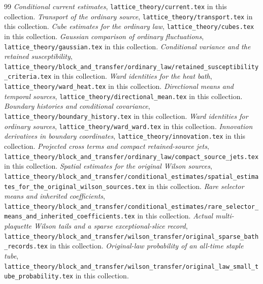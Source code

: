 \documentclass[11pt]{article}
\theoremstyle{definition}
\begin{document}
\begin{thebibliography}{99}
 \emph{Conditional current estimates}, \texttt{lattice\_theory/current.tex} in this collection.
 \emph{Transport of the ordinary source}, \texttt{lattice\_theory/transport.tex} in this collection.
 \emph{Cube estimates for the ordinary law}, \texttt{lattice\_theory/cubes.tex} in this collection.
 \emph{Gaussian comparison of ordinary fluctuations}, \texttt{lattice\_theory/gaussian.tex} in this collection.
 \emph{Conditional variance and the retained susceptibility},
\texttt{lattice\_theory/block\_and\_transfer/ordinary\_law/retained\_susceptibility\_criteria.tex} in this collection.
 \emph{Ward identities for the heat bath}, \texttt{lattice\_theory/ward\_heat.tex} in this collection.
 \emph{Directional means and temporal sources}, \texttt{lattice\_theory/directional\_mean.tex} in this collection.
 \emph{Boundary histories and conditional covariance}, \texttt{lattice\_theory/boundary\_history.tex} in this collection.
 \emph{Ward identities for ordinary sources}, \texttt{lattice\_theory/ward\_ward.tex} in this collection.
 \emph{Innovation derivatives in boundary coordinates}, \texttt{lattice\_theory/innovation.tex} in this collection.
 \emph{Projected cross terms and compact retained-source jets},
\texttt{lattice\_theory/block\_and\_transfer/ordinary\_law/compact\_source\_jets.tex} in this collection.
 \emph{Spatial estimates for the original Wilson sources},
\texttt{lattice\_theory/block\_and\_transfer/conditional\_estimates/spatial\_estimates\_for\_the\_original\_wilson\_sources.tex} in this collection.
 \emph{Rare selector means and inherited coefficients},
\texttt{lattice\_theory/block\_and\_transfer/conditional\_estimates/rare\_selector\_means\_and\_inherited\_coefficients.tex} in this collection.
 \emph{Actual multi-plaquette Wilson tails and a sparse exceptional-slice record},
\texttt{lattice\_theory/block\_and\_transfer/wilson\_transfer/original\_sparse\_bath\_records.tex} in this collection.
 \emph{Original-law probability of an all-time staple tube},
\texttt{lattice\_theory/block\_and\_transfer/wilson\_transfer/original\_law\_small\_tube\_probability.tex} in this collection.
\end{thebibliography}
\end{document}
